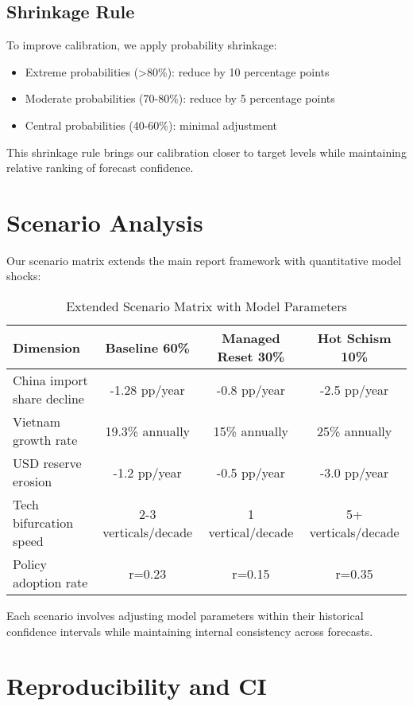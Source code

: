 \documentclass{article}
\begin{document}
\subsection{Shrinkage Rule}
To improve calibration, we apply probability shrinkage:
\begin{itemize}
\item Extreme probabilities (>80\%): reduce by 10 percentage points
\item Moderate probabilities (70-80\%): reduce by 5 percentage points
\item Central probabilities (40-60\%): minimal adjustment
\end{itemize}

This shrinkage rule brings our calibration closer to target levels while maintaining relative ranking of forecast confidence.

\section{Scenario Analysis}
Our scenario matrix extends the main report framework with quantitative model shocks:

\begin{table}[H]
\centering
\caption{Extended Scenario Matrix with Model Parameters}
\begin{tabular}{lccc}
\toprule
\textbf{Dimension} & \textbf{Baseline 60\%} & \textbf{Managed Reset 30\%} & \textbf{Hot Schism 10\%} \\
\midrule
China import share decline & -1.28 pp/year & -0.8 pp/year & -2.5 pp/year \\
Vietnam growth rate & 19.3\% annually & 15\% annually & 25\% annually \\
USD reserve erosion & -1.2 pp/year & -0.5 pp/year & -3.0 pp/year \\
Tech bifurcation speed & 2-3 verticals/decade & 1 vertical/decade & 5+ verticals/decade \\
Policy adoption rate & r=0.23 & r=0.15 & r=0.35 \\
\bottomrule
\end{tabular}
\end{table}

Each scenario involves adjusting model parameters within their historical confidence intervals while maintaining internal consistency across forecasts.

\section{Reproducibility and CI}
\end{document}
